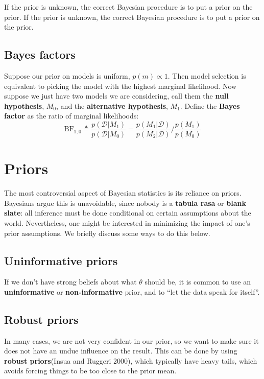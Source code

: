 If the prior is unknown, the correct Bayesian procedure is to put a prior on the prior. If the prior is unknown, the correct Bayesian procedure is to put a prior on the prior. 


\subsection{Bayes factors}
Suppose our prior on models is uniform, $p(m) \propto 1$. Then model selection is equivalent to picking the model with the highest marginal likelihood. Now suppose we just have two models we are considering, call them the \textbf{null hypothesis}, $M_0$, and the \textbf{alternative hypothesis}, $M_1$. Define the \textbf{Bayes factor} as the ratio of marginal likelihoods:
\begin{equation}
\mathrm{BF}_{1,0} \triangleq \dfrac{p(\mathcal{D}|M_1)}{p(\mathcal{D}|M_0)}=\dfrac{p(M_1|\mathcal{D})}{p(M_2|\mathcal{D})}/\dfrac{p(M_1)}{p(M_0)}
\end{equation}


\section{Priors}
The most controversial aspect of Bayesian statistics is its reliance on priors. Bayesians argue this is unavoidable, since nobody is a \textbf{tabula rasa} or \textbf{blank slate}: all inference must be done conditional on certain assumptions about the world. Nevertheless, one might be interested in minimizing the impact of one’s prior assumptions. We briefly discuss some ways to do this below.


\subsection{Uninformative priors}
If we don’t have strong beliefs about what $\theta$ should be, it is common to use an \textbf{uninformative} or \textbf{non-informative} prior, and to “let the data speak for itself”.


\subsection{Robust priors}
In many cases, we are not very confident in our prior, so we want to make sure it does not have an undue influence on the result. This can be done by using \textbf{robust priors}(Insua and Ruggeri 2000), which typically have heavy tails, which avoids forcing things to be too close to the prior mean.


